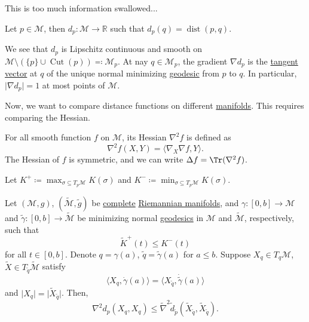 \begin{note}
	This is too much information swallowed...
\end{note}

\begin{notation}
	Let \(p\in \mathcal{M} \), then \(d_p \colon \mathcal{M} \to \mathbb{R} \) such that \(d_p(q) = \mathop{\mathrm{dist}}(p, q) \).
\end{notation}

We see that \(d_p\) is Lipschitz continuous and smooth on \(\mathcal{M} \setminus (\{ p \} \cup \mathop{\mathrm{Cut}}(p) ) \eqqcolon \mathcal{M} _p\). At nay \(q\in \mathcal{M} _p\), the gradient \(\nabla d_p\) is the \hyperref[def:tangent-vector]{tangent vector} at \(q\) of the unique normal minimizing \hyperref[def:geodesic]{geodesic} from \(p\) to \(q\). In particular, \(\vert \nabla d_p \vert = 1\) at most points of \(\mathcal{M} \).

Now, we want to compare distance functions on different \hyperref[def:smooth-manifold]{manifolds}. This requires comparing the Hessian.

\begin{prev}[Hessian]
	For all smooth function \(f\) on \(\mathcal{M} \), its Hessian \(\nabla ^2 f\) is defined as
	\[
		\nabla ^2 f(X, Y) = \langle \nabla _X \nabla f, Y \rangle.
	\]
	The Hessian of \(f\) is symmetric, and we can write \(\Delta f = \Tr (\nabla ^2 f)\).
\end{prev}

\begin{notation}
	Let \(K^+ \coloneqq \max _{\sigma \subseteq T_p \mathcal{M} } K(\sigma )\) and \(K^- \coloneqq \min _{\sigma \subseteq T_p \mathcal{M} } K(\sigma )\).
\end{notation}

\begin{theorem}\label{thm:comparsion-Hessian}
	Let \((\mathcal{M} , g)\), \((\widetilde{\mathcal{M}} , \widetilde{g} )\) be \hyperref[def:geodesically-complete]{complete} \hyperref[def:Riemannian-manifold]{Riemannian manifolds}, and \(\gamma \colon [0, b] \to \mathcal{M} \) and \(\widetilde{\gamma} \colon [0, b] \to \widetilde{\mathcal{M}} \) be minimizing normal \hyperref[def:geodesic]{geodesics} in \(\mathcal{M} \) and \(\widetilde{\mathcal{M}} \), respectively, such that
	\[
		\widetilde{K} ^+ (t)\leq K^-(t)
	\]
	for all \(t\in [0, b]\). Denote \(q = \gamma (a)\), \(\widetilde{q} = \widetilde{\gamma} (a)\) for \(a \leq b\). Suppose \(X_q\in T_q \mathcal{M}\), \(\widetilde{X} \in T_{\widetilde{q} } \widetilde{\mathcal{M}} \) satisfy
	\[
		\langle X_q, \dot{\gamma } (a) \rangle = \langle X_{\widetilde{q} }, \dot{\widetilde{\gamma} } (a) \rangle
	\]
	and \(\vert X_q \vert = \vert \widetilde{X} _{\widetilde{q} } \vert \). Then,
	\[
		\nabla ^2 d_p(X_q, X_q) \leq \widetilde{\nabla} ^2 \widetilde{d} _{\widetilde{p} } (\widetilde{X} _{\widetilde{q} }, \widetilde{X} _{\widetilde{q} }).
	\]
\end{theorem}

